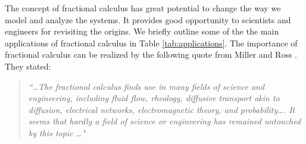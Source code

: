 \documentclass {llncs}
\begin{document}
 The concept of fractional calculus has great potential to change the way we model and analyze the systems.
 It provides good opportunity to scientists and engineers for revisiting the origins. We briefly outline some of the
 the main applications of fractional calculus in Table \ref{tab:applications}. The importance of fractional
calculus can be realized by the following  quote from Miller and Ross \cite{B2_93}. They stated:
 \begin{verse}

  \textit{``\ldots The  fractional  calculus  finds use  in many fields of science  and engineering,  including  fluid flow,  rheology,  diffusive  transport akin to diffusion,
electrical  networks,  electromagnetic  theory,  and probability\ldots. It  seems that  hardly a  field of science or
engineering has  remained  untouched by this topic \ldots" }
\end{verse}
\end{document}
